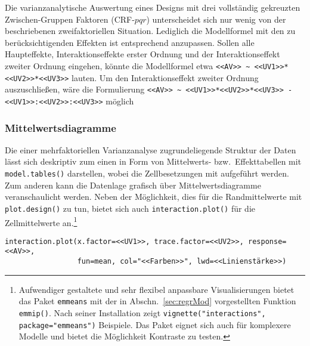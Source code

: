Die varianzanalytische Auswertung eines Designs mit drei vollständig gekreuzten Zwischen-Gruppen Faktoren (CRF-$pqr$) unterscheidet sich nur wenig von der beschriebenen zweifaktoriellen Situation. Lediglich die Modellformel mit den zu berücksichtigenden Effekten ist entsprechend anzupassen. Sollen alle Haupteffekte, Interaktionseffekte erster Ordnung und der Interaktionseffekt zweiter Ordnung eingehen, könnte die Modellformel etwa \lstinline!<<AV>> ~ <<UV1>>*<<UV2>>*<<UV3>>! lauten. Um den Interaktionseffekt zweiter Ordnung auszuschließen, wäre die Formulierung \lstinline!<<AV>> ~ <<UV1>>*<<UV2>>*<<UV3>> - <<UV1>>:<<UV2>>:<<UV3>>! möglich

\subsubsection{Mittelwertsdiagramme}

Die einer mehrfaktoriellen Varianzanalyse zugrundeliegende Struktur der Daten lässt sich deskriptiv zum einen in Form von Mittelwerts- bzw.\ Effekttabellen mit \lstinline!model.tables()! darstellen, wobei die Zellbesetzungen mit aufgeführt werden. Zum anderen kann die Datenlage grafisch über Mittelwertsdiagramme veranschaulicht werden. Neben der Möglichkeit, dies für die Randmittelwerte mit \lstinline!plot.design()! zu tun, bietet sich auch \lstinline!interaction.plot()! für die Zellmittelwerte an.\footnote{\label{ftn:emmeans}Aufwendiger gestaltete und sehr flexibel anpassbare Visualisierungen bietet das Paket \lstinline!emmeans! mit der in Abschn.\ \ref{sec:regrMod} vorgestellten Funktion \lstinline!emmip()!. Nach seiner Installation zeigt \lstinline!vignette("interactions", package="emmeans")! Beispiele. Das Paket eignet sich auch für komplexere Modelle und bietet die Möglichkeit Kontraste zu testen.}
\begin{lstlisting}
interaction.plot(x.factor=<<UV1>>, trace.factor=<<UV2>>, response=<<AV>>,
                 fun=mean, col="<<Farben>>", lwd=<<Linienstärke>>)
\end{lstlisting}


